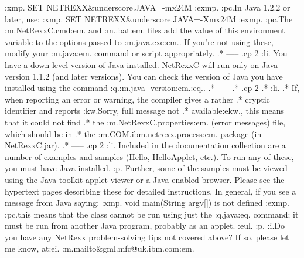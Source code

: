 :xmp.
SET NETREXX&underscore.JAVA=-mx24M
:exmp.
:pc.In Java 1.2.2 or later, use:
:xmp.
SET NETREXX&underscore.JAVA=-Xmx24M
:exmp.
:pc.The :m.NetRexxC.cmd:em. and :m..bat:em. files add the value of this
environment variable to the options passed to :m.java.exe:em..  If
you're not using these, modify your :m.java:em. command or script
appropriately.
.* -----
.cp 2
:li.
You have a down-level version of Java installed.  NetRexxC will
run only on Java version 1.1.2 (and later versions).  You can check the
version of Java you have installed using the command :q.:m.java
-version:em.:eq..
.* -----
.* .cp 2
.* :li.
.* If, when reporting an error or warning, the compiler gives a rather
.* cryptic identifier and reports :kw.Sorry, full message not
.* available:ekw., this means that it could not find
.* the :m.NetRexxC.properties:em. (error messages) file, which should be in
.* the :m.COM.ibm.netrexx.process:em. package (in NetRexxC.jar).
.* -----
.cp 2
:li.
Included in the documentation collection are a number of examples and
samples (Hello, HelloApplet, etc.).  To run any of these, you must have
Java installed.
:p.
Further, some of the samples must be viewed using the Java toolkit
applet-viewer or a Java-enabled browser.  Please see the hypertext pages
describing these for detailed instructions.  In general, if you see a
message from Java saying:
:xmp.
void main(String argv[]) is not defined
:exmp.
:pc.this means that the class cannot be run using just the :q.java:eq.
command; it must be run from another Java program, probably as an
applet.
:eul.
:p.
:i.Do you have any NetRexx problem-solving tips not covered above?  If
so, please let me know, at:ei. :m.mailto&gml.mfc@uk.ibm.com:em.
